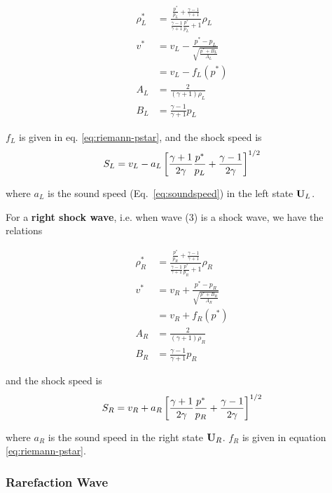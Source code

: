 \begin{align}
\rho^*_L &=
	\frac{\frac{p^*}{p_L} + \frac{\gamma - 1}{\gamma+1}}
	{\frac{\gamma - 1}{\gamma+1} \frac{p^*}{p_L} + 1}
	\rho_L \\
v^* &=
	v_L - \frac{p^* - p_L}{\sqrt{\frac{p^* + B_L}{A_L}}}\\
	& = v_L - f_L(p^*) \\
A_L &=
	\frac{2}{(\gamma + 1) \rho_L}\\
B_L &=
	\frac{\gamma - 1}{\gamma + 1} p_L
\end{align}

$f_{L}$ is given in eq. \ref{eq:riemann-pstar}, and the shock speed is
\begin{align}
S_L = v_L - a_L \left[\frac{\gamma + 1}{2 \gamma} \frac{p^*}{p_L} +
	\frac{\gamma - 1}{2\gamma} \right]^{1/2}
\end{align}

where $a_L$ is the sound speed (Eq.~\ref{eq:soundspeed}) in the left state
$\mathbf{U}_L$.



For a \textbf{right shock wave}, i.e. when wave (3) is a shock wave, we have
the relations


\begin{align}
\rho^*_R &=
	\frac{\frac{p^*}{p_R} + \frac{\gamma - 1}{\gamma+1}}
		{\frac{\gamma - 1}{\gamma+1} \frac{p^*}{p_R} + 1}
	\rho_R \\
v^* &=
	v_R + \frac{p^* - p_R}{\sqrt{\frac{p^* + B_R}{A_R}}}\\
	& = v_R + f_R(p^*) \\
A_R &=
	\frac{2}{(\gamma + 1) \rho_R}\\
B_R &=
	\frac{\gamma - 1}{\gamma + 1} p_R
\end{align}

and the shock speed is
\begin{align}
S_R = v_R + a_R \left[\frac{\gamma + 1}{2 \gamma} \frac{p^*}{p_R} +
	\frac{\gamma - 1}{2\gamma} \right]^{1/2}
\end{align}

where $a_R$ is the sound speed in the right state $\mathbf{U}_R$. $f_R$ is given in
equation \ref{eq:riemann-pstar}.








\subsubsection{Rarefaction Wave}

